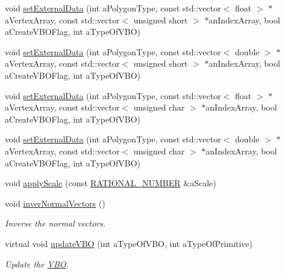\begin{DoxyCompactItemize}
void \hyperlink{class_graphics_1_1_polygon_mesh_a87fbf60171fc7befac1580256688a35c}{setExternalData} (int aPolygonType, const std::vector$<$ float $>$ $\ast$aVertexArray, const std::vector$<$ unsigned short $>$ $\ast$anIndexArray, bool aCreateVBOFlag, int aTypeOfVBO)
\item 
void \hyperlink{class_graphics_1_1_polygon_mesh_ad9b8e4f262f0f71c6e81c94e65abbd34}{setExternalData} (int aPolygonType, const std::vector$<$ double $>$ $\ast$aVertexArray, const std::vector$<$ unsigned short $>$ $\ast$anIndexArray, bool aCreateVBOFlag, int aTypeOfVBO)
\item 
void \hyperlink{class_graphics_1_1_polygon_mesh_a72789f03fd9d13ea564d61293c26aeaa}{setExternalData} (int aPolygonType, const std::vector$<$ float $>$ $\ast$aVertexArray, const std::vector$<$ unsigned char $>$ $\ast$anIndexArray, bool aCreateVBOFlag, int aTypeOfVBO)
\item 
void \hyperlink{class_graphics_1_1_polygon_mesh_aaaf9a96ac048c5d646de2bd5fad70390}{setExternalData} (int aPolygonType, const std::vector$<$ double $>$ $\ast$aVertexArray, const std::vector$<$ unsigned char $>$ $\ast$anIndexArray, bool aCreateVBOFlag, int aTypeOfVBO)
\item 
void \hyperlink{class_graphics_1_1_polygon_mesh_a6d2c8f160f1b8546dc32810aa97c0df6}{applyScale} (const \hyperlink{namespace_utilities_a40969b96bd8d847b962e297cb79f08ce}{RATIONAL\_\-NUMBER} \&aScale)
\item 
void \hyperlink{class_graphics_1_1_polygon_mesh_ab587ef84af5f44366b4c6e170aa35ea0}{inverNormalVectors} ()
\begin{DoxyCompactList}\small\item\em Inverse the normal vectors. \end{DoxyCompactList}\item 
virtual void \hyperlink{class_graphics_1_1_polygon_mesh_aee125712037722cbf8a2131017c2d662}{updateVBO} (int aTypeOfVBO, int aTypeOfPrimitive)
\begin{DoxyCompactList}\small\item\em Update the \hyperlink{class_graphics_1_1_v_b_o}{VBO}. \end{DoxyCompactList}\end{DoxyCompactItemize}
